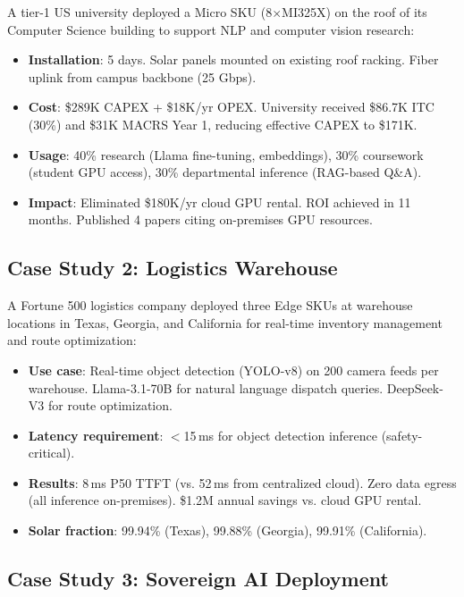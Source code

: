 \documentclass[conference,10pt,letterpaper]{IEEEtran}
\begin{document}
A tier-1 US university deployed a Micro SKU (8$\times$MI325X) on the roof of its Computer Science building to support NLP and computer vision research:

\begin{itemize}
\item \textbf{Installation}: 5 days. Solar panels mounted on existing roof racking. Fiber uplink from campus backbone (25 Gbps).
\item \textbf{Cost}: \$289K CAPEX + \$18K/yr OPEX. University received \$86.7K ITC (30\%) and \$31K MACRS Year 1, reducing effective CAPEX to \$171K.
\item \textbf{Usage}: 40\% research (Llama fine-tuning, embeddings), 30\% coursework (student GPU access), 30\% departmental inference (RAG-based Q\&A).
\item \textbf{Impact}: Eliminated \$180K/yr cloud GPU rental. ROI achieved in 11 months. Published 4 papers citing on-premises GPU resources.
\end{itemize}

\subsection{Case Study 2: Logistics Warehouse}

A Fortune 500 logistics company deployed three Edge SKUs at warehouse locations in Texas, Georgia, and California for real-time inventory management and route optimization:

\begin{itemize}
\item \textbf{Use case}: Real-time object detection (YOLO-v8) on 200 camera feeds per warehouse. Llama-3.1-70B for natural language dispatch queries. DeepSeek-V3 for route optimization.
\item \textbf{Latency requirement}: $<$15\,ms for object detection inference (safety-critical).
\item \textbf{Results}: 8\,ms P50 TTFT (vs. 52\,ms from centralized cloud). Zero data egress (all inference on-premises). \$1.2M annual savings vs. cloud GPU rental.
\item \textbf{Solar fraction}: 99.94\% (Texas), 99.88\% (Georgia), 99.91\% (California).
\end{itemize}

\subsection{Case Study 3: Sovereign AI Deployment}
\end{document}
